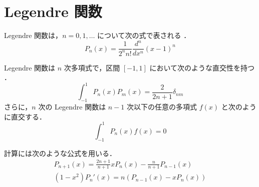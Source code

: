 %

\section{Legendre 関数}\label{sec:special-function_legendre-function}

Legendre 関数は，$n=0,1,\ldots$ について次の式で表される
\cite[Section 5.2]{Morse1953}．
\begin{equation}
    P_n(x) = \frac{1}{2^n n!} \frac{d^n}{dx^n} (x - 1)^n
\end{equation}

Legendre 関数は $n$ 次多項式で，区間 $[-1, 1]$ において次のような直交性を持つ
\cite[Section 6.3]{Morse1953}．
\begin{equation}
    \int_{-1}^{1} P_n(x) P_m(x) = \frac{2}{2n + 1} \delta_{nm}
\end{equation}
さらに，$n$ 次の Legendre 関数は $n-1$ 次以下の任意の多項式 $f(x)$ と次のように直交する．
\begin{equation}
    \int_{-1}^{1} P_n(x) f(x) = 0
\end{equation}

計算には次のような公式を用いる\cite[Section6.3]{Morse1953}．
\begin{gather}
    P_{n+1}(x) = \frac{2n+1}{n+1} x P_n(x) - \frac{n}{n+1} P_{n-1}(x) \\
    (1-x^2) P_n'(x) = n(P_{n-1}(x) - x P_n(x))
\end{gather}
